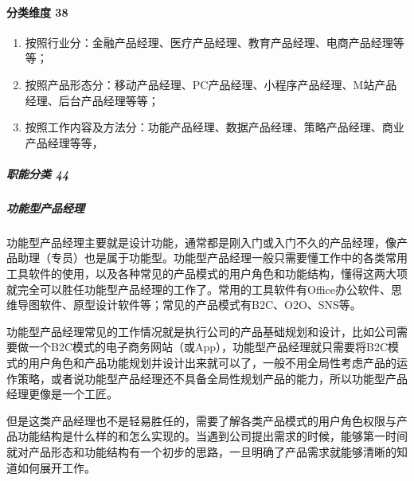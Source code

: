 \documentclass[letterpaper,11pt,english]{sphinxmanual}
\begin{document}
\paragraph{分类维度 38\sphinxfootnotemark[144]}
\label{\detokenize{chapter_introduction/PM:id17}}%
\begin{footnotetext}[144]\sphinxAtStartFootnote
{}
%
\end{footnotetext}\ignorespaces \begin{enumerate}
%
\item {} 
按照行业分：金融产品经理、医疗产品经理、教育产品经理、电商产品经理等等；

\item {} 
按照产品形态分：移动产品经理、PC产品经理、小程序产品经理、M站产品经理、后台产品经理等等；

\item {} 
按照工作内容及方法分：功能产品经理、数据产品经理、策略产品经理、商业产品经理等等，

\end{enumerate}


\subparagraph{职能分类 44\sphinxfootnotemark[145]}
\label{\detokenize{chapter_introduction/PM:id18}}%
\begin{footnotetext}[145]\sphinxAtStartFootnote
{}
%
\end{footnotetext}\ignorespaces 

\subparagraph{功能型产品经理}
\label{\detokenize{chapter_introduction/PM:id19}}
功能型产品经理主要就是设计功能，通常都是刚入门或入门不久的产品经理，像产品助理（专员）也是属于功能型。功能型产品经理一般只需要懂工作中的各类常用工具软件的使用，以及各种常见的产品模式的用户角色和功能结构，懂得这两大项就完全可以胜任功能型产品经理的工作了。常用的工具软件有Office办公软件、思维导图软件、原型设计软件等；常见的产品模式有B2C、O2O、SNS等。

功能型产品经理常见的工作情况就是执行公司的产品基础规划和设计，比如公司需要做一个B2C模式的电子商务网站（或App），功能型产品经理就只需要将B2C模式的用户角色和产品功能规划并设计出来就可以了，一般不用全局性考虑产品的运作策略，或者说功能型产品经理还不具备全局性规划产品的能力，所以功能型产品经理更像是一个工匠。

但是这类产品经理也不是轻易胜任的，需要了解各类产品模式的用户角色权限与产品功能结构是什么样的和怎么实现的。当遇到公司提出需求的时候，能够第一时间就对产品形态和功能结构有一个初步的思路，一旦明确了产品需求就能够清晰的知道如何展开工作。
\end{document}
